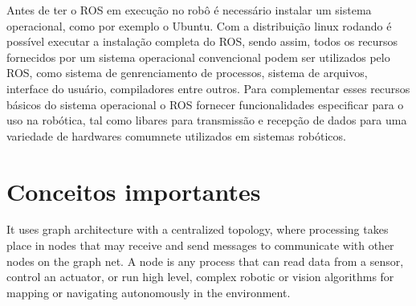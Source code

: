Antes de ter o ROS em execução no robô é necessário instalar um sistema operacional,
como por exemplo o Ubuntu. Com a distribuição linux rodando é possível executar a instalação completa 
do ROS, sendo assim, todos os recursos fornecidos por um sistema operacional convencional podem
ser utilizados pelo ROS, como sistema de genrenciamento de processos, sistema de arquivos, interface
do usuário, compiladores entre outros. Para complementar esses recursos básicos do sistema operacional
o ROS fornecer funcionalidades especificar para o uso na robótica, tal como libares para transmissão
e recepção de dados para uma variedade de hardwares comumnete utilizados em sistemas robóticos. 








\section{Conceitos importantes}

It uses graph architecture with a centralized topology, where processing takes place in nodes
that may receive and send messages to communicate with other nodes on the graph net. A
node is any process that can read data from a sensor, control an actuator, or run high level,
complex robotic or vision algorithms for mapping or navigating autonomously in the
environment.\cite{rosEfetiveProgram}

